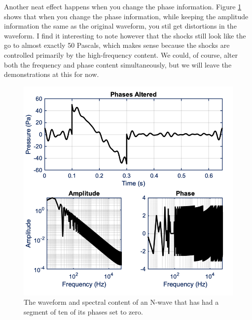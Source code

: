 Another neat effect happens when you change the phase information.
Figure \ref{fig:Phases Altered} shows that when you change the phase information, while keeping the amplitude information the same as the original waveform, you stil get distortions in the waveform. I find it interesting to note however that the shocks still look like the go to almost exactly 50 Pascals, which makes sense because the shocks are controlled primarily by the high-frequency content. We could, of course, alter both the frequency and phase content simultaneously, but we will leave the demonstrations at this for now.

\begin{figure}[H]
    \centering
    \includegraphics[width = 5 in]{Chapters/Signal Processing/Figures/Phases Altered.png}
    \caption{The waveform and spectral content of an N-wave that has had a segment of ten of its phases set to zero.}
    \label{fig:Phases Altered}
\end{figure}